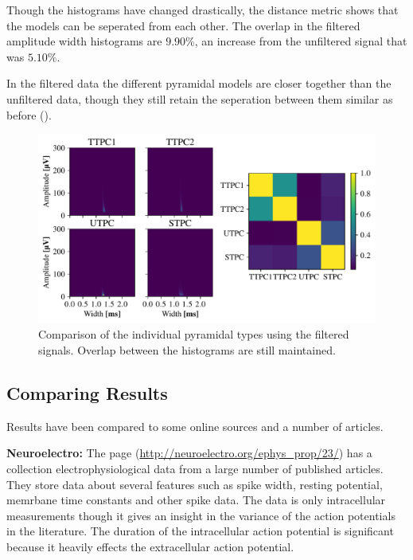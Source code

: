 \documentclass[altfont, fleqn]{uiophd}
\renewcommand{\cref}[1]{{\color{viridis_03}\mycref{#1}}}
\begin{document}
Though the histograms have changed drastically, 
the distance metric shows that the models can be seperated 
from each other. 
The overlap in the filtered amplitude width histograms 
are $9.90\%$, an increase from the unfiltered signal that was 
$5.10\%$. 

In the filtered data the different 
pyramidal models are closer together than 
the unfiltered data, 
though they still retain the seperation between them similar as before
(\cref{fig:4_pyr_overlap_filt}).

\begin{figure}[h]
    \begin{center}
        \includegraphics[width=\linewidth]{images/sec_4/pyr_overlap_filt.pdf}
        \caption{
            Comparison of the individual pyramidal types using the filtered signals.
            Overlap between the histograms are still maintained.
        }
        \label{fig:4_pyr_overlap_filt}
    \end{center}
\end{figure}

\newpage
\subsection{Comparing Results}
Results have been compared to some online sources and a number of articles. 
\newpage

\noindent
{\bf Neuroelectro:}
The page 
\textcite{_neuroelectro_????}
(\url{http://neuroelectro.org/ephys_prop/23/})
has a collection electrophysiological data 
from a large number of published articles.  
They store data about several features such as spike width, resting potential, 
memrbane time constants 
and other spike data. 
The data is only intracellular measurements
though it gives an insight in the variance of the 
action potentials in the literature. 
The duration of the intracellular action potential is significant 
because it 
heavily effects the extracellular action potential. %
\end{document}
